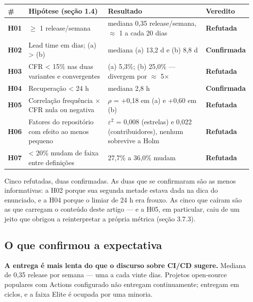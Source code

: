 \documentclass[12pt]{article}
\begin{document}
\begin{table}[!htbp]
\centering
\scriptsize
\begin{tabular}{p{}p{}p{}p{}}
\toprule
\textbf{\#} & \textbf{Hipótese (seção 1.4)} & \textbf{Resultado} & \textbf{Veredito} \\
\midrule
\textbf{H01} & $\geq$ 1 release/semana & mediana 0,35 release/semana, $\approx$ 1 a cada 20 dias & \textbf{Refutada} \\
\textbf{H02} & Lead time em dias; (a) > (b) & mediana (a) 13,2 d e (b) 8,8 d & \textbf{Confirmada} \\
\textbf{H03} & CFR < 15\% nas duas variantes e convergentes & (a) 5,3\%; (b) 25,0\% — divergem por $\approx$ 5$\times$ & \textbf{Refutada} \\
\textbf{H04} & Recuperação < 24 h & mediana 2,8 h & \textbf{Confirmada} \\
\textbf{H05} & Correlação frequência $\times$ CFR nula ou negativa & $\rho$ = +0,18 em (a) e +0,60 em (b) & \textbf{Refutada} \\
\textbf{H06} & Fatores do repositório com efeito ao menos pequeno & $\varepsilon$$^2$ = 0,008 (estrelas) e 0,022 (contribuidores), nenhum sobrevive a Holm & \textbf{Refutada} \\
\textbf{H07} & < 20\% mudam de faixa entre definições & 27,7\% a 36,0\% mudam & \textbf{Refutada} \\
\bottomrule
\end{tabular}
\end{table}

Cinco refutadas, duas confirmadas. As duas que se confirmaram são as menos informativas: a H02 porque sua segunda metade estava dada na dica do enunciado, e a H04 porque o limiar de 24 h era frouxo. As cinco que caíram são as que carregam o conteúdo deste artigo — e a H05, em particular, caiu de um jeito que obrigou a reinterpretar a própria métrica (seção 3.7.3).

\subsection{O que confirmou a expectativa}

\textbf{A entrega é mais lenta do que o discurso sobre CI/CD sugere.} Mediana de 0,35 release por semana — uma a cada vinte dias. Projetos open-source populares com Actions configurado não entregam continuamente; entregam em ciclos, e a faixa Elite é ocupada por uma minoria.
\end{document}

